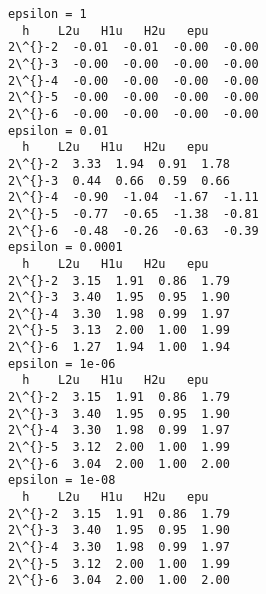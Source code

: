 \documentclass[11pt]{article}
\begin{document}
    \begin{Verbatim}[commandchars=\\\{\}]
epsilon = 1
  h    L2u   H1u   H2u   epu
2\^{}-2  -0.01  -0.01  -0.00  -0.00
2\^{}-3  -0.00  -0.00  -0.00  -0.00
2\^{}-4  -0.00  -0.00  -0.00  -0.00
2\^{}-5  -0.00  -0.00  -0.00  -0.00
2\^{}-6  -0.00  -0.00  -0.00  -0.00
epsilon = 0.01
  h    L2u   H1u   H2u   epu
2\^{}-2  3.33  1.94  0.91  1.78
2\^{}-3  0.44  0.66  0.59  0.66
2\^{}-4  -0.90  -1.04  -1.67  -1.11
2\^{}-5  -0.77  -0.65  -1.38  -0.81
2\^{}-6  -0.48  -0.26  -0.63  -0.39
epsilon = 0.0001
  h    L2u   H1u   H2u   epu
2\^{}-2  3.15  1.91  0.86  1.79
2\^{}-3  3.40  1.95  0.95  1.90
2\^{}-4  3.30  1.98  0.99  1.97
2\^{}-5  3.13  2.00  1.00  1.99
2\^{}-6  1.27  1.94  1.00  1.94
epsilon = 1e-06
  h    L2u   H1u   H2u   epu
2\^{}-2  3.15  1.91  0.86  1.79
2\^{}-3  3.40  1.95  0.95  1.90
2\^{}-4  3.30  1.98  0.99  1.97
2\^{}-5  3.12  2.00  1.00  1.99
2\^{}-6  3.04  2.00  1.00  2.00
epsilon = 1e-08
  h    L2u   H1u   H2u   epu
2\^{}-2  3.15  1.91  0.86  1.79
2\^{}-3  3.40  1.95  0.95  1.90
2\^{}-4  3.30  1.98  0.99  1.97
2\^{}-5  3.12  2.00  1.00  1.99
2\^{}-6  3.04  2.00  1.00  2.00
    \end{Verbatim}


    
    
    
\end{document}

